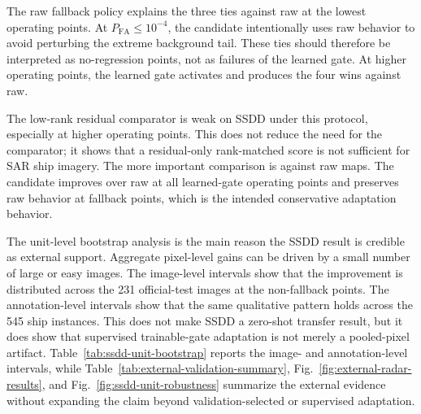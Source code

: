 \documentclass[journal]{IEEEtran}
\begin{document}
The raw fallback policy explains the three ties against raw at the lowest operating points. At $P_{\mathrm{FA}} \leq 10^{-4}$, the candidate intentionally uses raw behavior to avoid perturbing the extreme background tail. These ties should therefore be interpreted as no-regression points, not as failures of the learned gate. At higher operating points, the learned gate activates and produces the four wins against raw.

The low-rank residual comparator is weak on SSDD under this protocol, especially at higher operating points. This does not reduce the need for the comparator; it shows that a residual-only rank-matched score is not sufficient for SAR ship imagery. The more important comparison is against raw maps. The candidate improves over raw at all learned-gate operating points and preserves raw behavior at fallback points, which is the intended conservative adaptation behavior.

The unit-level bootstrap analysis is the main reason the SSDD result is credible as external support. Aggregate pixel-level gains can be driven by a small number of large or easy images. The image-level intervals show that the improvement is distributed across the 231 official-test images at the non-fallback points. The annotation-level intervals show that the same qualitative pattern holds across the 545 ship instances. This does not make SSDD a zero-shot transfer result, but it does show that supervised trainable-gate adaptation is not merely a pooled-pixel artifact. Table~\ref{tab:ssdd-unit-bootstrap} reports the image- and annotation-level intervals, while Table~\ref{tab:external-validation-summary}, Fig.~\ref{fig:external-radar-results}, and Fig.~\ref{fig:ssdd-unit-robustness} summarize the external evidence without expanding the claim beyond validation-selected or supervised adaptation.
\end{document}
